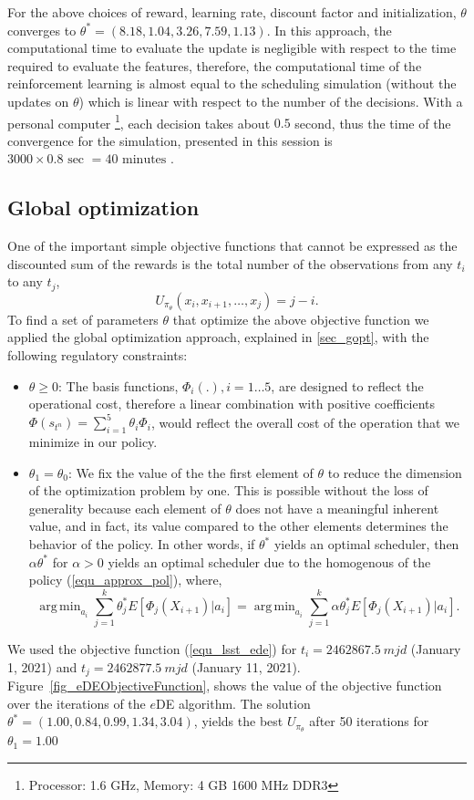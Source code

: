 \documentclass[11pt]{article}
\theoremstyle{definition}
\DeclareMathOperator*{\argmin}{arg\,min}
\begin{document}
For the above choices of reward, learning rate, discount factor and initialization, $\theta$ converges to $\theta^* = (8.18,  1.04,  3.26,  7.59,  1.13)$.
In this approach, the computational time to evaluate the update is negligible with respect to the time required to evaluate the features, therefore, the computational time of the reinforcement learning is almost equal to the scheduling simulation (without the updates on $\theta$) which is linear with respect to the number of the decisions. With a personal computer \footnote{Processor: 1.6 GHz, Memory: 4 GB 1600 MHz DDR3}, each decision takes about $0.5$ second, thus the time of the convergence for the simulation, presented in this session is $3000\times 0.8 \text{ sec } = 40 \text{ minutes }$.

\subsection{Global optimization}\label{sec_globalopt}
One of the important simple objective functions that cannot be expressed as the discounted sum of the rewards is the total number of the observations from any $t_i$ to any $t_j$,
\begin{equation}\label{equ_lsst_ede}
U_{\pi_{\theta}}(x_i, x_{i+1}, \dots, x_j) = j - i.
\end{equation}
To find a set of parameters $\theta$ that optimize the above objective function we applied the global optimization approach, explained in \ref{sec_gopt}, with the following regulatory constraints:
\begin{itemize}
\item $\theta \geq 0$: The basis functions, $\Phi_i(.), i = 1\dots 5$, are designed to reflect the operational cost, therefore a linear combination with positive coefficients $\Phi(s_{t^n})= \sum_{i=1}^5 \theta_i \Phi_i$, would reflect the overall cost of the operation that we minimize in our policy.
\item $\theta_1 =\theta_0$: We fix the value of the the first element of $\theta$ to reduce the dimension of the optimization problem by one. This is possible without the loss of generality because each element of $\theta$ does not have a meaningful inherent value, and in fact, its value compared to the other elements determines the behavior of the policy. In other words, if $\theta^*$ yields an optimal scheduler, then $\alpha \theta^*$ for $\alpha > 0$ yields an optimal scheduler due to the homogenous of the policy (\ref{equ_approx_pol}), where, 
\begin{equation*}
\argmin_{a_{i}} \sum_{j=1}^k \theta^*_j E[\Phi_j(X_{i+1}) | a_{i}] = \argmin_{a_{i}} \sum_{j=1}^k \alpha \theta^*_j E[\Phi_j(X_{i+1}) | a_{i}].
\end{equation*}
\end{itemize}
We used the objective function (\ref{equ_lsst_ede}) for $t_i = 2462867.5~mjd$ (January 1, 2021) and $t_j = 2462877.5~mjd$ (January 11, 2021). Figure~\ref{fig_eDEObjectiveFunction}, shows the value of the objective function over the iterations of the $e$DE algorithm. The solution $\theta^* = (1.00, 0.84, 0.99,  1.34,  3.04)$, yields the best $U_{\pi_{\theta}}$ after 50 iterations for $\theta_1 = 1.00$
\end{document}
